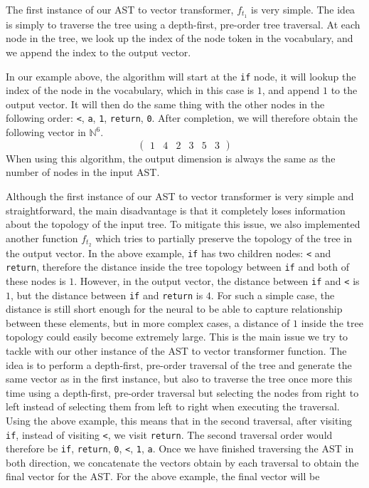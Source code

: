 The first instance of our AST to vector transformer, $f_{t_1}$ is very simple.
The idea is simply to traverse the tree using a depth-first, pre-order tree
traversal. At each node in the tree, we look up the index of the node token in
the vocabulary, and we append the index to the output vector.

In our example above, the algorithm will start at the \lstinline{if} node, it
will lookup the index of the node in the vocabulary, which in this case is $1$,
and append $1$ to the output vector. It will then do the same thing with the
other nodes in the following order: \lstinline{<}, \lstinline{a}, \lstinline{1},
\lstinline{return}, \lstinline{0}. After completion, we will therefore obtain
the following vector in $\mathbb{N}^6$.
\begin{equation}
  \label{eq:sample-indexes-vector}
  \begin{pmatrix}1 & 4 & 2 & 3 & 5 & 3\end{pmatrix}
\end{equation}
When using this algorithm, the output dimension is always the same as the
number of nodes in the input AST.

Although the first instance of our AST to vector transformer is very simple and
straightforward, the main disadvantage is that it completely loses information
about the topology of the input tree. To mitigate this issue, we also
implemented another function $f_{t_2}$ which tries to partially preserve the
topology of the tree in the output vector. In the above example, \lstinline{if}
has two children nodes: \lstinline{<} and \lstinline{return}, therefore the
distance inside the tree topology between \lstinline{if} and both of these nodes
is $1$. However, in the output vector, the distance between \lstinline{if} and
\lstinline{<} is $1$, but the distance between \lstinline{if} and
\lstinline{return} is $4$. For such a simple case, the distance is still short
enough for the neural to be able to capture relationship between these elements,
but in more complex cases, a distance of $1$ inside the tree topology could
easily become extremely large. This is the main issue we try to tackle with our
other instance of the AST to vector transformer function. The idea is to perform
a depth-first, pre-order traversal of the tree and generate the same vector as
in the first instance, but also to traverse the tree once more this time using a
depth-first, pre-order traversal but selecting the nodes from right to left
instead of selecting them from left to right when executing the traversal. Using
the above example, this means that in the second traversal, after visiting
\lstinline{if}, instead of visiting \lstinline{<}, we visit \lstinline{return}.
The second traversal order would therefore be \lstinline{if},
\lstinline{return}, \lstinline{0}, \lstinline{<}, \lstinline{1}, \lstinline{a}.
Once we have finished traversing the AST in both direction, we concatenate the
vectors obtain by each traversal to obtain the final vector for the AST. For the
above example, the final vector will be

